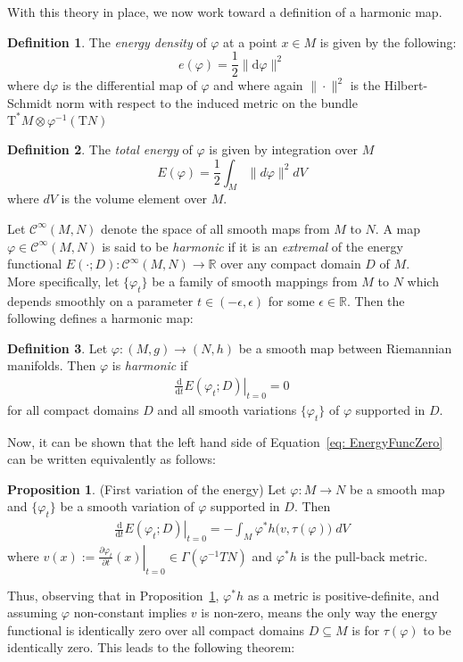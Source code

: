 \documentclass[12pt]{article}
\newcommand{\diff}{\text{d}}
\theoremstyle{definition}
\newtheorem{definition}{Definition}[section]
\newtheorem{proposition}{Proposition}[subsection]
\numberwithin{equation}{subsection}
\begin{document}
With this theory in place, we now work toward a definition of a harmonic map.
\begin{definition}
The \textit{energy density} of $\varphi$ at a point $x \in M$ is given by the following:
$$
e(\varphi) = \frac{1}{2}\| \diff\varphi \|^2
$$
where $\diff\varphi$ is the differential map of $\varphi$ and where again $\| \cdot \|^2$ is the Hilbert-Schmidt norm with respect to the induced metric on the bundle $\text{T}^*M \otimes \varphi^{-1}(\text{T}N)$
\end{definition}
\begin{definition}
The \textit{total energy} of $\varphi$ is given by integration over $M$
$$
E(\varphi) = \frac{1}{2}\int_M \| d\varphi \|^2 dV
$$
where $dV$ is the volume element over $M$.\\
\end{definition}


Let $\mathcal{C}^\infty(M, N)$ denote the space of all smooth maps from $M$ to $N$. A map $\varphi \in \mathcal{C}^\infty(M, N)$ is said to be \textit{harmonic} if it is an \textit{extremal} of the energy functional $E( \cdot; D): \mathcal{C}^\infty(M, N) \rightarrow \mathbb{R}$ over any compact domain $D$ of $M$.\\
More specifically, let $\{ \varphi_t \}$ be a family of smooth mappings from $M$ to $N$ which depends smoothly on a parameter $t \in (-\epsilon, \epsilon)$ for some $\epsilon \in \mathbb{R}$.  Then the following defines a harmonic map:

\begin{definition}
Let $\varphi: (M,g) \rightarrow (N,h)$ be a smooth map between Riemannian manifolds. Then $\varphi$ is \textit{harmonic} if 
\begin{align} \label{eq: EnergyFuncZero}
    \left.\frac{\diff}{\diff t}E(\varphi_t; D) \right|_{t=0} = 0 
\end{align}
for all compact domains $D$ and all smooth variations $\{\varphi_t\}$ of $\varphi$ supported in $D$. 
\end{definition}
Now, it can be shown that the left hand side of Equation~\ref{eq: EnergyFuncZero} can be written equivalently as follows:
\begin{proposition} \label{prop:1stVarEnergy}
(First variation of the energy) Let $\varphi: M \rightarrow N$ be a smooth map and $\{ \varphi_t\}$ be a smooth variation of $\varphi$ supported in $D$. Then
\begin{align}
        \left.\frac{\diff}{\diff t}E(\varphi_t; D) \right|_{t=0} =  -\int_M \varphi^* h\big( v , \tau(\varphi) \big)\; dV
\end{align}
where $v(x) := \left.\frac{\partial \varphi_t}{\partial t} (x) \right|_{t=0} \in \Gamma(\varphi^{-1}TN)$ and $\varphi^*h$ is the pull-back metric.
\end{proposition}
Thus, observing that in Proposition~\ref{prop:1stVarEnergy}, $\varphi^*h$ as a metric is positive-definite, and assuming $\varphi$ non-constant implies $v$ is non-zero, means the only way the energy functional is identically zero over all compact domains $D \subseteq M$ is for $\tau(\varphi)$ to be identically zero. This leads to the following theorem:
\end{document}
